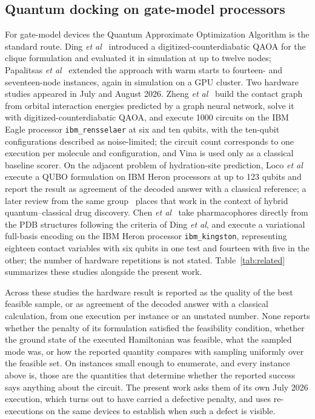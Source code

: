 \documentclass{iopjournal}
\begin{document}
\subsection{Quantum docking on gate-model processors}
\label{sec:rel-gate}
For gate-model devices the Quantum Approximate Optimization Algorithm is the standard route. Ding \textit{et al}~\cite{ding2024docking} introduced a digitized-counterdiabatic QAOA for the clique formulation and evaluated it in simulation at up to twelve nodes; Papalitsas \textit{et al}~\cite{papalitsas2025qaoa} extended the approach with warm starts to fourteen- and seventeen-node instances, again in simulation on a GPU cluster. Two hardware studies appeared in July and August 2026. Zheng \textit{et al}~\cite{zheng2026qscore} build the contact graph from orbital interaction energies predicted by a graph neural network, solve it with digitized-counterdiabatic QAOA, and execute 1000 circuits on the IBM Eagle processor \texttt{ibm\_rensselaer} at six and ten qubits, with the ten-qubit configurations described as noise-limited; the circuit count corresponds to one execution per molecule and configuration, and Vina is used only as a classical baseline scorer. On the adjacent problem of hydration-site prediction, Loco \textit{et al}~\cite{loco2025hydration} execute a QUBO formulation on IBM Heron processors at up to 123 qubits and report the result as agreement of the decoded answer with a classical reference; a later review from the same group~\cite{ansari2026convergence} places that work in the context of hybrid quantum--classical drug discovery. Chen \textit{et al}~\cite{chen2026fbe} take pharmacophores directly from the PDB structures following the criteria of Ding \textit{et al}, and execute a variational full-basis encoding on the IBM Heron processor \texttt{ibm\_kingston}, representing eighteen contact variables with six qubits in one test and fourteen with five in the other; the number of hardware repetitions is not stated. Table~\ref{tab:related} summarizes these studies alongside the present work.

Across these studies the hardware result is reported as the quality of the best feasible sample, or as agreement of the decoded answer with a classical calculation, from one execution per instance or an unstated number. None reports whether the penalty of its formulation satisfied the feasibility condition, whether the ground state of the executed Hamiltonian was feasible, what the sampled mode was, or how the reported quantity compares with sampling uniformly over the feasible set. On instances small enough to enumerate, and every instance above is, those are the quantities that determine whether the reported success says anything about the circuit. The present work asks them of its own July 2026 execution, which turns out to have carried a defective penalty, and uses re-executions on the same devices to establish when such a defect is visible.
\end{document}
